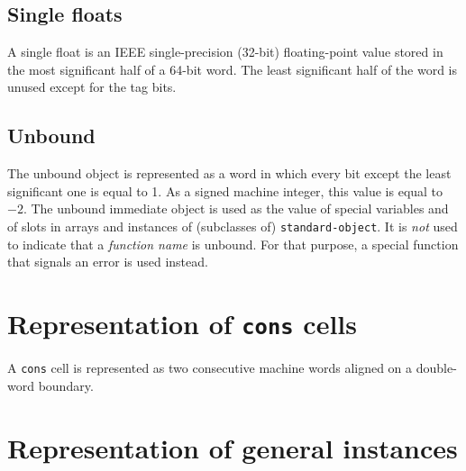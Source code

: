 \subsection{Single floats}

A single float is an IEEE single-precision (32-bit) floating-point
value stored in the most significant half of a 64-bit word.  The least
significant half of the word is unused except for the tag bits. 

\subsection{Unbound}
\label{data-representation-unbound}

The unbound object is represented as a word in which every bit except
the least significant one is equal to 1.  As a signed machine integer,
this value is equal to $-2$.  The unbound immediate object is used
as the value of special variables and of slots in arrays and instances
of (subclasses of) \texttt{standard-object}.  It is \emph{not} used to
indicate that a \emph{function name} is unbound.  For that purpose, a
special function that signals an error is used instead. 

\section{Representation of \texttt{cons} cells}

A \texttt{cons} cell is represented as two consecutive machine
words aligned on a double-word boundary.

\section{Representation of general instances}
\label{sec-data-representation-general-instances}

